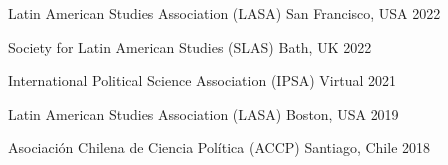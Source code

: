 





\hspace{2.25mm}{\footnotesize $^\star$ Selección solo de los últimos cinco años}

\vspace{1mm}

\begin{cvhonors}
\cvconf
{Latin American Studies Association (LASA)} 
{San Francisco, USA}
{2022}
\end{cvhonors}

\begin{cvhonors}
\cvconf
{Society for Latin American Studies (SLAS)} 
{Bath, UK}
{2022}
\end{cvhonors}


\begin{cvhonors}
\cvconf
{International Political Science Association (IPSA)} 
{Virtual}
{2021}
\end{cvhonors}

\begin{cvhonors}
\cvconf
{Latin American Studies Association (LASA)} 
{Boston, USA}
{2019}
\end{cvhonors}

\begin{cvhonors}
\cvconf
{Asociación Chilena de Ciencia Política (ACCP)} 
{Santiago, Chile}
{2018}
\end{cvhonors}

